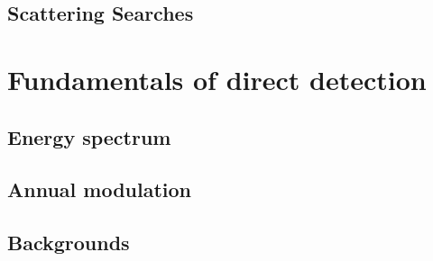
\subsection{Scattering Searches}


\section{Fundamentals of direct detection}

\subsection{Energy spectrum}

\subsection{Annual modulation}

\subsection{Backgrounds}
